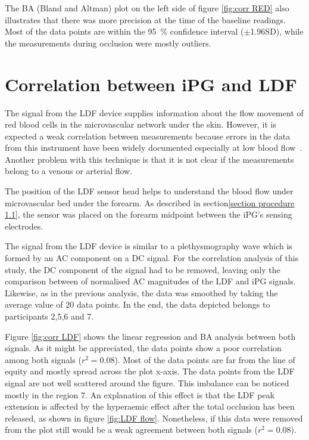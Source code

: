 The BA (Bland and Altman) plot on the left side of figure \ref{fig:corr RED} also illustrates that there was more precision at the time of the baseline readings. Most of the data points are within the \SI{95}{\percent} confidence interval ($\pm $1.96SD), while the measurements during occlusion were mostly outliers.

\section{Correlation between iPG and LDF}  %
\label{section correlation 4}
The signal from the LDF device supplies information about the flow movement of red blood cells in the microvascular network under the skin. However, it is expected a weak correlation between measurements because errors in the data from this instrument have been widely documented especially at low blood flow~\cite{perkash1988difficulties}. Another problem with this technique is that it is not clear if the measurements belong to a venous or arterial flow. 

The position of the LDF sensor head helps to understand the blood flow under microvascular bed under the forearm. As described in section\ref{section procedure 1.1}, the sensor was placed on the forearm midpoint between the iPG's sensing electrodes. 

The signal from the LDF device is similar to a plethysmography wave which is formed by an AC component on a DC signal. For the correlation analysis of this study, the DC component of the signal had to be removed, leaving only the comparison between of normalised AC magnitudes of the LDF and iPG signals. Likewise, as in the previous analysis, the data was smoothed by taking the average value of 20 data points. In the end, the data depicted belongs to participants 2,5,6 and 7.

Figure \ref{fig:corr LDF} shows the linear regression and  BA analysis between both signals. As it might be appreciated, the data points show a poor correlation among both signals ($r^2 = 0.08$). Most of the data points are far from the line of equity and mostly spread across the plot x-axis. The data points from the LDF signal are not well scattered around the figure. This imbalance can be noticed mostly in the region 7.  An explanation of this effect is that the LDF peak extension is affected by the hyperaemic effect after the total occlusion has been released, as shown in figure \ref{fig:LDF flow}. Nonetheless, if this data were removed from the plot still would be a weak agreement between both signals ($r^2 = 0.08$).

